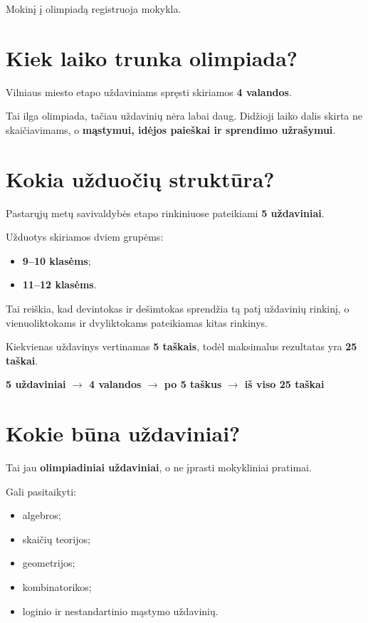 \documentclass[11pt,a4paper]{article}
\newcommand{\calloutbox}[1]{%
  \begin{center}
  \colorbox{callout}{%
    \parbox{0.94\textwidth}{\centering\bfseries #1}%
  }
  \end{center}
}
\begin{document}
Mokinį į olimpiadą registruoja mokykla.

\section{Kiek laiko trunka olimpiada?}

Vilniaus miesto etapo uždaviniams spręsti skiriamos \textbf{4 valandos}.

Tai ilga olimpiada, tačiau uždavinių nėra labai daug. Didžioji laiko dalis skirta ne skaičiavimams, o \textbf{mąstymui, idėjos paieškai ir sprendimo užrašymui}.

\section{Kokia užduočių struktūra?}

Pastarųjų metų savivaldybės etapo rinkiniuose pateikiami \textbf{5 uždaviniai}.

Užduotys skiriamos dviem grupėms:
\begin{itemize}
  \item \textbf{9--10 klasėms};
  \item \textbf{11--12 klasėms}.
\end{itemize}

Tai reiškia, kad devintokas ir dešimtokas sprendžia tą patį uždavinių rinkinį, o vienuoliktokams ir dvyliktokams pateikiamas kitas rinkinys.

Kiekvienas uždavinys vertinamas \textbf{5 taškais}, todėl maksimalus rezultatas yra \textbf{25 taškai}.

\calloutbox{5 uždaviniai $\rightarrow$ 4 valandos $\rightarrow$ po 5 taškus $\rightarrow$ iš viso 25 taškai}

\section{Kokie būna uždaviniai?}

Tai jau \textbf{olimpiadiniai uždaviniai}, o ne įprasti mokykliniai pratimai.

Gali pasitaikyti:
\begin{itemize}
  \item algebros;
  \item skaičių teorijos;
  \item geometrijos;
  \item kombinatorikos;
  \item loginio ir nestandartinio mąstymo uždavinių.
\end{itemize}
\end{document}
